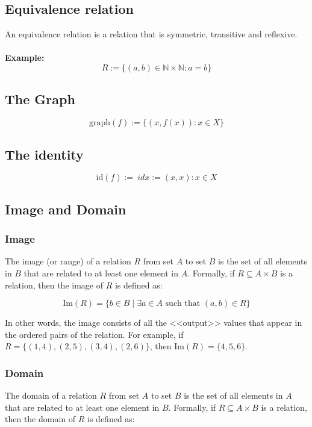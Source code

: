 \subsection{Equivalence relation}
An equivalence relation is a relation that is symmetric, transitive and reflexive.
\\\\
\textbf{Example:}
\[
	R:= \{ (a,b) \in \mathbb{N} \times \mathbb{N}: a = b\}
\]

\subsection{The Graph}

\[
	\text{graph}(f):= \{(x, f(x)): x \in X\}
\]

\subsection{The identity}

\[
	\text{id}(f):= \ idx:={(x, x): x \in X}
\]

\subsection{Image and Domain}

\subsubsection*{Image}
The image (or range) of a relation \(R\) from set \(A\) to set \(B\) is the set of all elements in \(B\) that are related to at least one element in \(A\). Formally, if \(R \subseteq A \times B\) is a relation, then the image of \(R\) is defined as:

\[\text{Im}(R) = \{b \in B \mid \exists a \in A \text{ such that } (a,b) \in R\}\]

In other words, the image consists of all the <<output>> values that appear in the ordered pairs of the relation. For example, if \(R = \{(1,4), (2,5), (3,4), (2,6)\}\), then \(\text{Im}(R) = \{4, 5, 6\}\).

\subsubsection*{Domain}
The domain of a relation \(R\) from set \(A\) to set \(B\) is the set of all elements in \(A\) that are related to at least one element in \(B\). Formally, if \(R \subseteq A \times B\) is a relation, then the domain of \(R\) is defined as:

